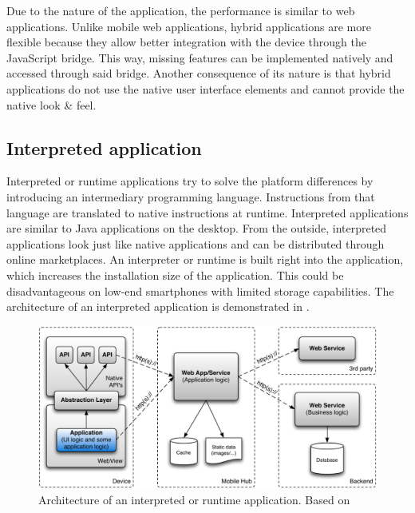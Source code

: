 Due to the nature of the application, the performance is similar to web applications. Unlike mobile web applications, hybrid applications are more flexible because they allow better integration with the device through the JavaScript bridge. This way, missing features can be implemented natively and accessed through said bridge. Another consequence of its nature is that hybrid applications do not use the native user interface elements and cannot provide the native look \& feel. 


\subsection{Interpreted application}

Interpreted or runtime applications try to solve the platform differences by introducing an intermediary programming language. Instructions from that language are translated to native instructions at runtime. Interpreted applications are similar to Java applications on the desktop. From the outside, interpreted applications look just like native applications and can be distributed through online marketplaces. An interpreter or runtime is built right into the application, which increases the installation size of the application. This could be disadvantageous on low-end smartphones with limited storage capabilities. The architecture of an interpreted application is demonstrated in .

\begin{figure}[h]
    \begin{center}
        \includegraphics[width=\textwidth]{figs/interpreted.pdf}
        \caption{Architecture of an interpreted or runtime application. Based on \cite{Friese}}
        \label{fig:interpreted}
    \end{center}
\end{figure}

